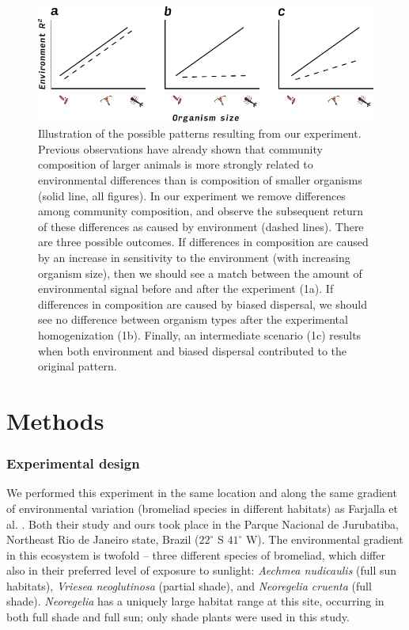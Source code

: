 \begin{figure}[htbp]
\centering
\includegraphics[width=5.5in]{figures/hypotheses_illustration.pdf}
\caption[Illustration of the possible patterns resulting from our
experiment.]{Illustration of the possible patterns resulting from our
experiment. Previous observations have already shown that community
composition of larger animals is more strongly related to environmental
differences than is composition of smaller organisms (solid line, all
figures). In our experiment we remove differences among community
composition, and observe the subsequent return of these differences as
caused by environment (dashed lines). There are three possible outcomes.
If differences in composition are caused by an increase in sensitivity
to the environment (with increasing organism size), then we should see a
match between the amount of environmental signal before and after the
experiment (1a). If differences in composition are caused by biased
dispersal, we should see no difference between organism types after the
experimental homogenization (1b). Finally, an intermediate scenario (1c)
results when both environment and biased dispersal contributed to the
original pattern.}
\label{fig:illustration}
\end{figure}

\section{Methods}\label{methods}

\subsubsection{Experimental design}\label{experimental-design}

We performed this experiment in the same location and along the same
gradient of environmental variation (bromeliad species in different
habitats) as Farjalla et al. \citeyearpar{Farjalla2012}. Both their
study and ours took place in the Parque Nacional de Jurubatiba,
Northeast Rio de Janeiro state, Brazil (\(22^{\circ}\) S \(41^{\circ}\)
W). The environmental gradient in this ecosystem is twofold -- three
different species of bromeliad, which differ also in their preferred
level of exposure to sunlight: \emph{Aechmea nudicaulis} (full sun
habitats), \emph{Vriesea neoglutinosa} (partial shade), and
\emph{Neoregelia cruenta} (full shade). \emph{Neoregelia} has a uniquely
large habitat range at this site, occurring in both full shade and full
sun; only shade plants were used in this study.


